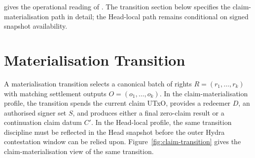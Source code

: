 \documentclass[a4paper,11pt]{article}
\theoremstyle{definition}
\theoremstyle{plain}
\theoremstyle{remark}
\begin{document}
 gives the operational reading of
. The
transition section below specifies the claim-materialisation path in detail; the
Head-local path remains conditional on signed snapshot availability.

\section{Materialisation Transition}
\label{sec:transition}

A materialisation transition selects a canonical batch of rights
\(R=(r_1,\ldots,r_k)\) with matching settlement outputs
\(O=(o_1,\ldots,o_k)\). In the claim-materialisation profile, the transition
spends the current claim UTxO, provides a redeemer \(D\), an authorised signer
set \(S\), and produces either a final zero-claim result or a continuation
claim datum \(C'\). In the Head-local profile, the same transition discipline
must be reflected in the Head snapshot before the outer Hydra contestation
window can be relied upon. Figure~\ref{fig:claim-transition} gives the
claim-materialisation view of the same transition.
\end{document}
